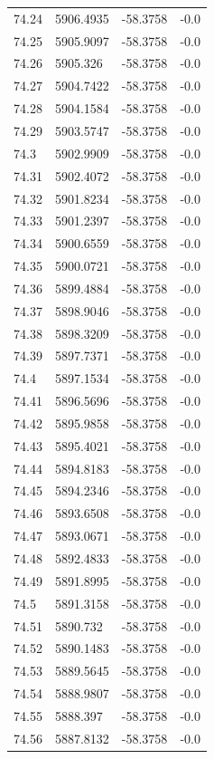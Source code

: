\begin{table}[H]
\begin{tabular}{llll}
74.24 & 5906.4935 & -58.3758 & -0.0 \\
74.25 & 5905.9097 & -58.3758 & -0.0 \\
74.26 & 5905.326 & -58.3758 & -0.0 \\
74.27 & 5904.7422 & -58.3758 & -0.0 \\
74.28 & 5904.1584 & -58.3758 & -0.0 \\
74.29 & 5903.5747 & -58.3758 & -0.0 \\
74.3 & 5902.9909 & -58.3758 & -0.0 \\
74.31 & 5902.4072 & -58.3758 & -0.0 \\
74.32 & 5901.8234 & -58.3758 & -0.0 \\
74.33 & 5901.2397 & -58.3758 & -0.0 \\
74.34 & 5900.6559 & -58.3758 & -0.0 \\
74.35 & 5900.0721 & -58.3758 & -0.0 \\
74.36 & 5899.4884 & -58.3758 & -0.0 \\
74.37 & 5898.9046 & -58.3758 & -0.0 \\
74.38 & 5898.3209 & -58.3758 & -0.0 \\
74.39 & 5897.7371 & -58.3758 & -0.0 \\
74.4 & 5897.1534 & -58.3758 & -0.0 \\
74.41 & 5896.5696 & -58.3758 & -0.0 \\
74.42 & 5895.9858 & -58.3758 & -0.0 \\
74.43 & 5895.4021 & -58.3758 & -0.0 \\
74.44 & 5894.8183 & -58.3758 & -0.0 \\
74.45 & 5894.2346 & -58.3758 & -0.0 \\
74.46 & 5893.6508 & -58.3758 & -0.0 \\
74.47 & 5893.0671 & -58.3758 & -0.0 \\
74.48 & 5892.4833 & -58.3758 & -0.0 \\
74.49 & 5891.8995 & -58.3758 & -0.0 \\
74.5 & 5891.3158 & -58.3758 & -0.0 \\
74.51 & 5890.732 & -58.3758 & -0.0 \\
74.52 & 5890.1483 & -58.3758 & -0.0 \\
74.53 & 5889.5645 & -58.3758 & -0.0 \\
74.54 & 5888.9807 & -58.3758 & -0.0 \\
74.55 & 5888.397 & -58.3758 & -0.0 \\
74.56 & 5887.8132 & -58.3758 & -0.0 \\

\end{tabular}
\end{table}

